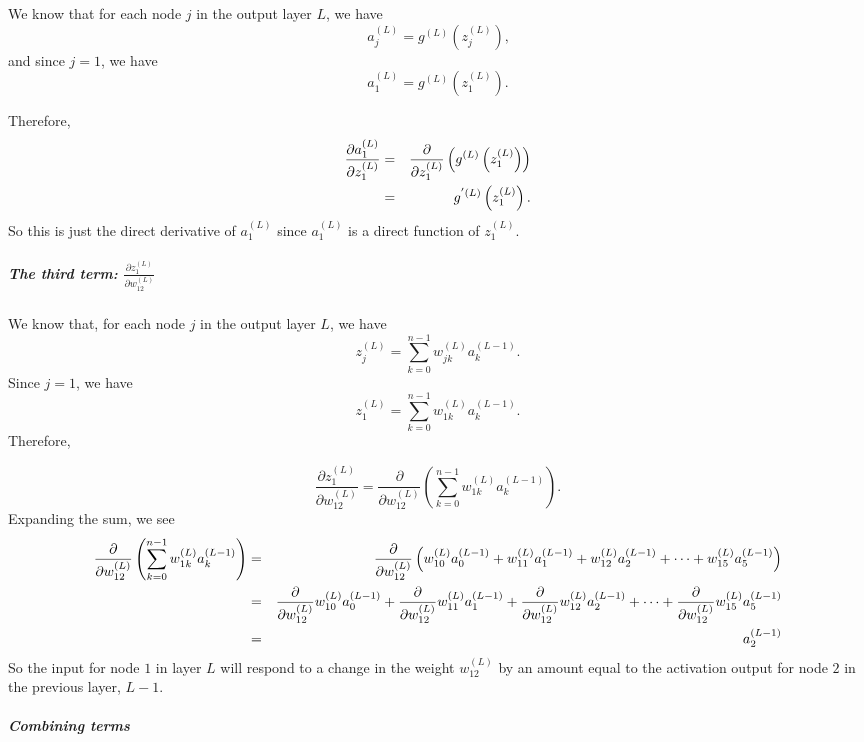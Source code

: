 \documentclass{article}
\begin{document}
We know that for each node $j$ in the output layer $L$, we have 
\[
a_{j}^{\left( L\right) }=g^{\left( L\right) }\left( z_{j}^{\left( L\right)
}\right) \text{,} 
\]%
and since $j=1$, we have%
\[
a_{1}^{\left( L\right) }=g^{\left( L\right) }\left( z_{1}^{\left( L\right)
}\right) \text{.} 
\]

Therefore,%
\begin{eqnarray*}
\frac{\partial a_{1}^{(L)}}{\partial z_{1}^{(L)}} &=&\frac{\partial }{%
\partial z_{1}^{(L)}}\left( g^{\left( L\right) }\left( z_{1}^{\left(
L\right) }\right) \right) \\
&=&g^{^{\prime }\left( L\right) }\left( z_{1}^{\left( L\right) }\right) 
\text{.}
\end{eqnarray*}%
So this is just the direct derivative of $a_{1}^{(L)}$ since $a_{1}^{(L)}$
is a direct function of $z_{1}^{\left( L\right) }$.

\subparagraph{The third term: $\frac{\partial z_{1}^{(L)}}{\partial
w_{12}^{(L)}}$}

\vspace{1pt}We know that, for each node $j$ in the output layer $L$, we have 
\[
z_{j}^{(L)}=\sum_{k=0}^{n-1}w_{jk}^{(L)}a_{k}^{(L-1)}\text{.} 
\]%
Since $j=1$, we have%
\[
z_{1}^{(L)}=\sum_{k=0}^{n-1}w_{1k}^{(L)}a_{k}^{(L-1)}\text{.} 
\]%
Therefore,

\[
\frac{\partial z_{1}^{(L)}}{\partial w_{12}^{(L)}}=\frac{\partial }{\partial
w_{12}^{(L)}}\left( \sum_{k=0}^{n-1}w_{1k}^{(L)}a_{k}^{(L-1)}\right) \text{.}
\]%
Expanding the sum, we see 
\begin{eqnarray*}
\frac{\partial }{\partial w_{12}^{(L)}}\left(
\sum_{k=0}^{n-1}w_{1k}^{(L)}a_{k}^{(L-1)}\right) &=&\frac{\partial }{%
\partial w_{12}^{(L)}}\left(
w_{10}^{(L)}a_{0}^{(L-1)}+w_{11}^{(L)}a_{1}^{(L-1)}+w_{12}^{(L)}a_{2}^{(L-1)}+\cdots +w_{15}^{(L)}a_{5}^{(L-1)}\right)
\\
&=&\frac{\partial }{\partial w_{12}^{(L)}}w_{10}^{(L)}a_{0}^{(L-1)}+\frac{%
\partial }{\partial w_{12}^{(L)}}w_{11}^{(L)}a_{1}^{(L-1)}+\frac{\partial }{%
\partial w_{12}^{(L)}}w_{12}^{(L)}a_{2}^{(L-1)}+\cdots +\frac{\partial }{%
\partial w_{12}^{(L)}}w_{15}^{(L)}a_{5}^{(L-1)} \\
&=&a_{2}^{(L-1)}
\end{eqnarray*}%
So the input for node $1$ in layer $L$ will respond to a change in the
weight $w_{12}^{(L)}$ by an amount equal to the activation output for node $%
2 $ in the previous layer, $L-1$.

\subparagraph{\protect\vspace{1pt}Combining terms}
\end{document}
